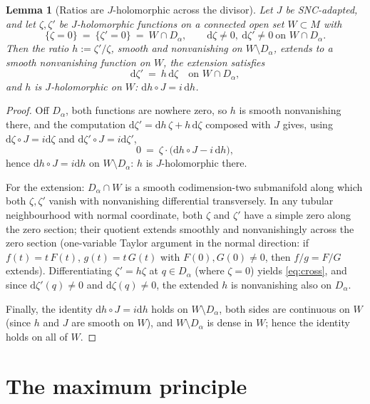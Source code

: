 \documentclass[11pt]{article}
\newtheorem{lemma}[theorem]{Lemma}
\theoremstyle{definition}
\theoremstyle{remark}
\newcommand{\dd}{\mathrm{d}}
\begin{document}
\begin{lemma}[Ratios are $J$-holomorphic across the divisor]
\label{lem:ratio}
Let $J$ be SNC-adapted, and let $\zeta,\zeta'$ be $J$-holomorphic
functions on a connected open set $W\subset M$ with
\[
\{\zeta=0\}\ =\ \{\zeta'=0\}\ =\ W\cap D_\alpha,
\qquad \dd\zeta\neq0,\ \dd\zeta'\neq0\ \text{on }W\cap D_\alpha .
\]
Then the ratio $h:=\zeta'/\zeta$, smooth and nonvanishing on
$W\setminus D_\alpha$, extends to a smooth nonvanishing function on
$W$, the extension satisfies
\begin{equation}\label{eq:cross}
\dd\zeta'\ =\ h\,\dd\zeta\quad\text{on }W\cap D_\alpha,
\end{equation}
and $h$ is $J$-holomorphic on $W$: $\dd h\circ J=i\,\dd h$.
\end{lemma}
\begin{proof}
Off $D_\alpha$, both functions are nowhere zero, so $h$ is smooth
nonvanishing there, and the computation
$\dd\zeta'=\dd h\,\zeta+h\,\dd\zeta$ composed with $J$ gives, using
$\dd\zeta\circ J=i\dd\zeta$ and $\dd\zeta'\circ J=i\dd\zeta'$,
\[
0\ =\ \zeta\cdot\bigl(\dd h\circ J-i\,\dd h\bigr),
\]
hence $\dd h\circ J=i\dd h$ on $W\setminus D_\alpha$: $h$ is
$J$-holomorphic there.

For the extension: $D_\alpha\cap W$ is a smooth codimension-two
submanifold along which both $\zeta,\zeta'$ vanish with nonvanishing
differential transversely. In any tubular neighbourhood with normal
coordinate, both ${\zeta}$ and ${\zeta}'$ have a simple zero along
the zero section; their quotient extends smoothly and nonvanishingly
across the zero section (one-variable Taylor argument in the normal
direction: if $f(t)=t\,F(t)$, $g(t)=t\,G(t)$ with $F(0),G(0)\neq0$,
then $f/g=F/G$ extends). 
Differentiating
$\zeta'=h\zeta$ at $q\in D_\alpha$ (where $\zeta=0$) yields
\eqref{eq:cross}, and since $\dd\zeta'(q)\neq0$ and
$\dd\zeta(q)\neq0$, the extended $h$ is nonvanishing also on
$D_\alpha$.

Finally, the identity $\dd h\circ J=i\dd h$ holds on
$W\setminus D_\alpha$, both sides are continuous on $W$ (since $h$
and $J$ are smooth on $W$), and $W\setminus D_\alpha$ is dense in
$W$; hence the identity holds on all of $W$.
\end{proof}

\section{The maximum principle}\label{sec:max}
\end{document}
